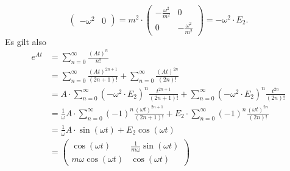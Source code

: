 \documentclass{article}
\theoremstyle{definition}
\begin{document}
\begin{enumerate}[(a)]
$$\begin{pmatrix}
        -\omega^2 & 0
    \end{pmatrix} = m^2 \cdot \begin{pmatrix}
        -\frac{\omega^2}{m^2} & 0\\ 0 & -\frac{\omega^2}{m^2}
    \end{pmatrix} = - \omega^2 \cdot E_2.$$
    Es gilt also 
    \begin{align*}
        e^{At} &= \sum_{n = 0}^{\infty}\frac{(At)^n}{n!}\\
        &= \sum_{n = 0}^{\infty} \frac{(At)^{2n+1}}{(2n+1)!} + \sum_{n = 0}^{\infty} \frac{(At)^{2n}}{(2n)!}\\
        &= A \cdot \sum_{n = 0}^{\infty}  (- \omega^2 \cdot E_2)^n \frac{t^{2n+1}}{(2n+1)!} + \sum_{n = 0}^{\infty} (- \omega^2 \cdot E_2)^n \frac{t^{2n}}{(2n)!}\\
        &= \frac{1}{\omega} A \cdot \sum_{n = 0}^{\infty}  (-1)^n  \frac{(\omega t)^{2n+1}}{(2n+1)!} + E_2 \cdot \sum_{n = 0}^{\infty} (- 1)^n \frac{(\omega t)^{2n}}{(2n)!}\\
        &= \frac{1}{\omega} A \cdot \sin(\omega t) + E_2 \cos(\omega t)\\
        &= \begin{pmatrix}
            \cos(\omega t) & \frac{1}{m\omega} \sin(\omega t)\\
            m \omega \cos(\omega t) & \cos(\omega t)
        \end{pmatrix}
    \end{align*}
\end{enumerate}
\end{document}
